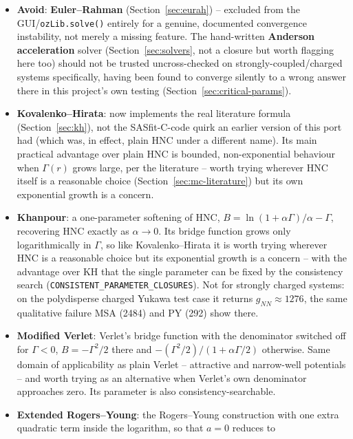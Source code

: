 \documentclass[11pt,a4paper]{article}
\newcommand{\code}[1]{\texttt{#1}}
\begin{document}
\begin{itemize}[nosep]
    parameter-free closures against genuine Monte Carlo benchmarks
    \cite{pihlajamaa2024}.
  \item \textbf{Avoid}: \textbf{Euler--Rahman} (Section~\ref{sec:eurah}) --
    excluded from the GUI/\code{ozLib.solve()} entirely for a
    genuine, documented convergence instability, not merely a missing
    feature. The hand-written \textbf{Anderson acceleration} solver
    (Section~\ref{sec:solvers}, not a closure but worth flagging here too)
    should not be trusted uncross-checked on strongly-coupled/charged
    systems specifically, having been found to converge silently to a wrong
    answer there in this project's own testing
    (Section~\ref{sec:critical-params}).
  \item \textbf{Kovalenko--Hirata}: now implements the real literature
    formula (Section~\ref{sec:kh}), not the SASfit-C-code quirk an
    earlier version of this port had (which was, in effect, plain HNC
    under a different name). Its main practical advantage over plain
    HNC is bounded, non-exponential behaviour when $\Gamma(r)$ grows
    large, per the literature \cite{ebato2016} -- worth trying wherever
    HNC itself is a reasonable choice (Section~\ref{sec:mc-literature})
    but its own exponential growth is a concern.
  \item \textbf{Khanpour}: a one-parameter softening of HNC,
    $B = \ln(1+\alpha\Gamma)/\alpha - \Gamma$, recovering HNC exactly as
    $\alpha\to0$. Its bridge function grows only logarithmically in $\Gamma$,
    so like Kovalenko--Hirata it is worth trying wherever HNC is a reasonable
    choice but its exponential growth is a concern -- with the advantage over
    KH that the single parameter can be fixed by the consistency search
    (\code{CONSISTENT\_PARAMETER\_CLOSURES}). Not for strongly charged
    systems: on the polydisperse charged Yukawa test case it returns
    $g_{NN}\approx1276$, the same qualitative failure MSA (2484) and PY (292)
    show there.
  \item \textbf{Modified Verlet}: Verlet's bridge function with the
    denominator switched off for $\Gamma<0$,
    $B=-\Gamma^2/2$ there and $-(\Gamma^2/2)/(1+\alpha\Gamma/2)$ otherwise.
    Same domain of applicability as plain Verlet -- attractive and
    narrow-well potentials -- and worth trying as an alternative when
    Verlet's own denominator approaches zero. Its parameter is also
    consistency-searchable.
  \item \textbf{Extended Rogers--Young}: the Rogers--Young construction with
    one extra quadratic term inside the logarithm, so that $a=0$ reduces to

\end{itemize}
\end{document}
